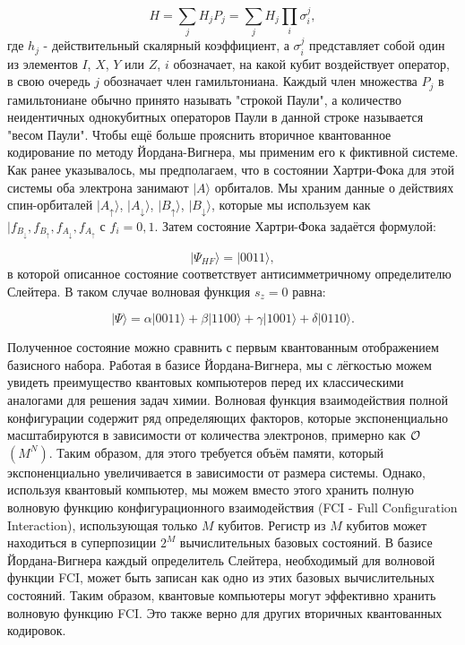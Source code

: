 \documentclass[a4paper]{report}
\begin{document}
    \begin{equation}\label{}
    H=\sum_jH_jP_j=\sum_jH_j\prod_i\sigma_i^j,
    \nonumber
    \end{equation}
где ${h_j}$ - действительный скалярный коэффициент, а ${\sigma^j_i}$ представляет собой один из элементов ${I}$, ${X}$, ${Y}$ или ${Z}$, ${i}$ обозначает, на какой кубит воздействует оператор, в свою очередь ${j}$ обозначает член гамильтониана. Каждый член множества ${P_j}$ в гамильтониане обычно принято называть "строкой Паули"\:\!, а количество неидентичных однокубитных операторов Паули в данной строке называется "весом Паули". Чтобы ещё больше прояснить вторичное квантованное кодирование по методу Йордана-Вигнера, мы применим его к фиктивной системе. Как ранее указывалось, мы предполагаем, что в состоянии Хартри-Фока для этой системы оба электрона занимают ${|A\rangle}$ орбиталов. Мы храним данные о действиях спин-орбиталей ${|A_{\uparrow}\rangle}$, ${|A_{\downarrow}\rangle}$, ${|B_{\uparrow}\rangle}$, ${|B_{\downarrow}\rangle}$, которые мы используем как ${|f_{B_{\downarrow}}, f_{B_{\uparrow}}, f_{A_{\downarrow}}, f_{A_{\uparrow}}}$ с ${f_i=0, 1}$. Затем состояние Хартри-Фока задаётся формулой:

    \begin{equation}\label{}
    |\Psi_{HF}\rangle=|0011\rangle,
    \nonumber
    \end{equation}
в которой описанное состояние соответствует антисимметричному определителю Слейтера. В таком случае волновая функция ${s_z=0}$ равна:

    \begin{equation}\label{}
    |\Psi\rangle=\alpha|0011\rangle+\beta|1100\rangle+\gamma|1001\rangle+\delta|0110\rangle.
    \nonumber
    \end{equation}

Полученное состояние можно сравнить с первым квантованным отображением базисного набора. Работая в базисе Йордана-Вигнера, мы с лёгкостью можем увидеть преимущество квантовых компьютеров перед их классическими аналогами для решения задач химии. Волновая функция взаимодействия полной конфигурации содержит ряд определяющих факторов, которые экспоненциально масштабируются в зависимости от количества электронов, примерно как ${\cal{O}}$${(M^N)}$. Таким образом, для этого требуется объём памяти, который экспоненциально увеличивается в зависимости от размера системы. Однако, используя квантовый компьютер, мы можем вместо этого хранить полную волновую функцию конфигурационного взаимодействия (FCI - Full Configuration Interaction), использующая только ${M}$ кубитов. Регистр из ${M}$ кубитов может находиться в суперпозиции ${2^M}$ вычислительных базовых состояний. В базисе Йордана-Вигнера каждый определитель Слейтера, необходимый для волновой функции FCI, может быть записан как одно из этих базовых вычислительных состояний. Таким образом, квантовые компьютеры могут эффективно хранить волновую функцию FCI. Это также верно для других вторичных квантованных кодировок.
\end{document}
